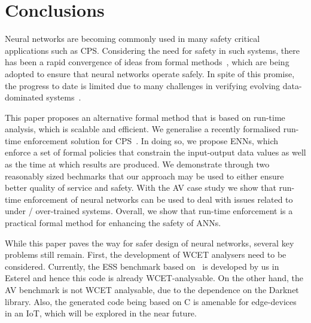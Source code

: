 \section{Conclusions}

Neural networks are becoming commonly used in many  safety critical applications such as
\acf{CPS}. 
Considering the need for safety in such systems, there has been a rapid convergence of
ideas from formal methods~\cite{formal-methods}, which are being adopted to ensure
that neural networks operate safely. In spite of this promise, the progress to date is limited
due to many challenges in verifying evolving data-dominated systems~\cite{seshia2016towards}.

This paper proposes an alternative formal method that is based on run-time analysis, which is scalable and efficient. 
We generalise a recently formalised run-time enforcement solution for
CPS~\cite{theoryRE}. In doing so, we propose \acfp{ENN}, which enforce a set
of formal policies that constrain the
 input-output data values as well as the time at which results
are produced. We demonstrate through two
reasonably sized bechmarks that our approach may be used to
either ensure better quality of service and safety. 
With the
\acf{AV} case study we show that run-time enforcement of
neural networks can be used to deal with issues related to under
/ over-trained systems. Overall, we show that run-time enforcement is
a practical formal method for enhancing the safety of \acfp{ANN}.

While this paper paves the way for safer design of neural networks,
several key problems still remain. First, the development of \ac{WCET}
analysers 
need to be considered. Currently, the \ac{ESS} benchmark based on~\cite{chaudhari2017hybrid} is
developed by us in Esterel and hence this code is already
WCET-analysable. On the other hand, the \ac{AV} benchmark is not
\ac{WCET} analysable, due to the dependence on the Darknet library.
 Also, the generated code being based on C is amenable for
 edge-devices in an IoT, which will be
explored in the near future.

